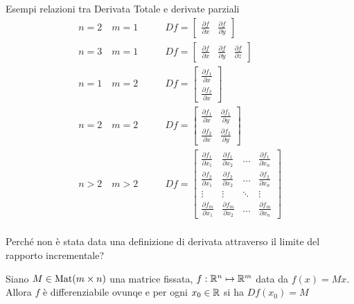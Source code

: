 \begin{example}
	Esempi relazioni tra Derivata Totale e derivate parziali
	\begin{align*}
		n = 2 \quad m = 1 \qquad & Df =
		\begin{bmatrix}
			\frac{\partial f}{\partial x} & \frac{\partial f}{\partial y}
		\end{bmatrix}\\
		n = 3 \quad m = 1 \qquad & Df =
		\begin{bmatrix}
			\frac{\partial f}{\partial x} & \frac{\partial f}{\partial y} &  \frac{\partial f}{\partial z}
		\end{bmatrix}\\
		n = 1 \quad m = 2 \qquad & Df =
		\begin{bmatrix}
			\frac{\partial f_1}{\partial x}\\[1ex]
			\frac{\partial f_2}{\partial x}
		\end{bmatrix}\\
		n = 2 \quad m = 2 \qquad & Df =
		\begin{bmatrix}
			\frac{\partial f_1}{\partial x} & \frac{\partial f_1}{\partial y}\\[1ex]
			\frac{\partial f_2}{\partial x} & \frac{\partial f_2}{\partial y}
		\end{bmatrix}\\
		n > 2 \quad m > 2 \qquad & Df =
		\begin{bmatrix}
			\frac{\partial f_1}{\partial x_1} & \frac{\partial f_1}{\partial x_2} & \dots & \frac{\partial f_1}{\partial x_n}\\[1ex]
			\frac{\partial f_2}{\partial x_1} & \frac{\partial f_2}{\partial x_2} & \dots & \frac{\partial f_2}{\partial x_n}\\[1ex]
			\vdots & \vdots & \ddots & \vdots\\[1ex]
			\frac{\partial f_m}{\partial x_1} & \frac{\partial f_m}{\partial x_2} & \dots & \frac{\partial f_m}{\partial x_n}
		\end{bmatrix}\\
	\end{align*}
\end{example}
\begin{exercise}
	Perché non è stata data una definizione di derivata attraverso il limite del rapporto incrementale?
\end{exercise}
\begin{example}
	Siano $M \in \operatorname{Mat}(m \times n)$ una matrice fissata, $f: \mathbb{R}^n \mapsto \mathbb{R}^m$ data da $f(x) = Mx$.\\
	Allora $f$ è differenziabile ovunqe e per ogni $x_0 \in \mathbb{R}$ si ha $Df(x_0) = M$
\end{example}
